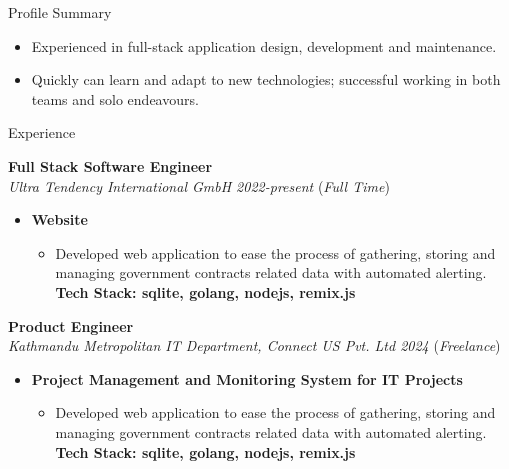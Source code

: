 \documentclass{resume} %
\begin{document}
\begin{rSection}{Profile Summary}
    \begin{itemize}
        \item  Experienced in full-stack application design, development and maintenance.
        \item  Quickly can learn and adapt to new technologies; successful working in both teams and solo endeavours.
    \end{itemize}
\end{rSection}

\begin{rSection}{Experience}

    \large{{\bf Full Stack Software Engineer}}
    \\ \small{\textit{Ultra Tendency International GmbH 2022-present}} (\small{\textit{Full Time}})

    \begin{itemize}
        \item \textbf{Website}
              \begin{itemize}
                  \item Developed web application to ease the process of gathering, storing and managing government contracts related data with automated alerting.
                        \\ \footnotesize{\textbf{Tech Stack: sqlite, golang, nodejs, remix.js }}
              \end{itemize}
    \end{itemize}

    \large{{\bf Product Engineer}}
    \\ \small{\textit{Kathmandu Metropolitan IT Department, Connect US Pvt. Ltd 2024}} (\small{\textit{Freelance}})

    \begin{itemize}
        \item \textbf{Project Management and Monitoring System for IT Projects}
              \begin{itemize}
                  \item Developed web application to ease the process of gathering, storing and managing government contracts related data with automated alerting.
                        \\ \footnotesize{\textbf{Tech Stack: sqlite, golang, nodejs, remix.js }}
              \end{itemize}
    \end{itemize}



\end{rSection}
\end{document}
